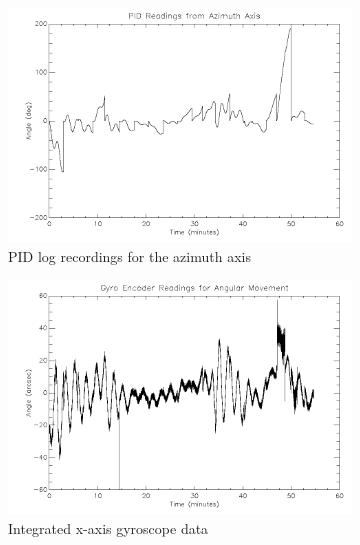 \begin{figure}[htbp]
\captionsetup[subfigure]{justification=centering}
\captionsetup{justification=centering}
    \centering
		\begin{subfigure}{0.45\textwidth}
		\includegraphics[width=1\linewidth]{appendix/img/campaign_results/pid_az.png}
		\caption{PID log recordings for the azimuth axis}
		\label{fig:sub:pidazvs}
	\end{subfigure}
	\begin{subfigure}{0.45\textwidth}
		\includegraphics[width=1\linewidth]{appendix/img/campaign_results/gyroint.png}
		\caption{Integrated x-axis gyroscope data}
		\label{fig:sub:gyrointx}
	\end{subfigure}
	\begin{subfigure}{0.45\textwidth}

\end{subfigure}
\end{figure}
